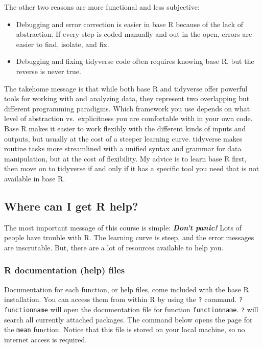 \documentclass[
  13,
  letterpaper,
]{report}
\begin{document}
The other two reasons are more functional and less subjective:

\begin{itemize}
\item
  Debugging and error correction is easier in base R because of the lack
  of abstraction. If every step is coded manually and out in the open,
  errors are easier to find, isolate, and fix.
\item
  Debugging and fixing tidyverse code often requires knowing base R, but
  the reverse is never true.
\end{itemize}

The takehome message is that while both base R and tidyverse offer
powerful tools for working with and analyzing data, they represent two
overlapping but different programming paradigms. Which framework you use
depends on what level of abstraction vs.~explicitness you are
comfortable with in your own code. Base R makes it easier to work
flexibly with the different kinds of inputs and outputs, but usually at
the cost of a steeper learning curve. tidyverse makes routine tasks more
streamlined with a unified syntax and grammar for data manipulation, but
at the cost of flexibility. My advice is to learn base R first, then
move on to tidyverse if and only if it has a specific tool you need that
is not available in base R.

\subsection{Where can I get R help?}\label{sec-02-faq-help}

The most important message of this course is simple: \textbf{\emph{Don't
panic!}} Lots of people have trouble with R. The learning curve is
steep, and the error messages are inscrutable. But, there are a lot of
resources available to help you.

\subsubsection{R documentation (help) files}\label{sec-02-faq-help-doc}

Documentation for each function, or help files, come included with the
base R installation. You can access them from within R by using the
\texttt{?} command. \texttt{?functionname} will open the documentation
file for function \texttt{functionname}. \texttt{?} will search all
currently attached packages. The command below opens the page for the
\texttt{mean} function. Notice that this file is stored on your local
machine, so no internet access is required.
\end{document}
